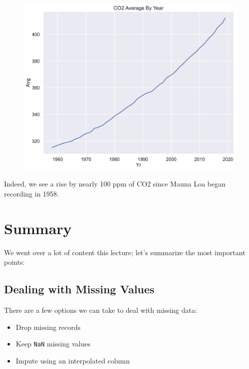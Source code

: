 \documentclass[
  letterpaper,
  DIV=11,
  numbers=noendperiod]{scrreprt}
\providecommand{\tightlist}{%
  \setlength{\itemsep}{0pt}\setlength{\parskip}{0pt}}\usepackage{longtable,booktabs,array}
\begin{document}
\begin{figure}[H]

{\centering \includegraphics{eda/eda_files/figure-pdf/cell-77-output-1.pdf}

}

\end{figure}

Indeed, we see a rise by nearly 100 ppm of CO2 since Mauna Loa began
recording in 1958.

\hypertarget{summary}{%
\section{Summary}\label{summary}}

We went over a lot of content this lecture; let's summarize the most
important points:

\hypertarget{dealing-with-missing-values}{%
\subsection{Dealing with Missing
Values}\label{dealing-with-missing-values}}

There are a few options we can take to deal with missing data:

\begin{itemize}
\tightlist
\item
  Drop missing records
\item
  Keep \texttt{NaN} missing values
\item
  Impute using an interpolated column
\end{itemize}
\end{document}
